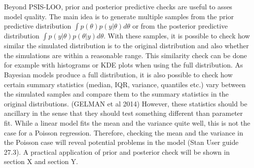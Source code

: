 Beyond PSIS-LOO, prior and posterior predictive checks are useful to asses model quality.
The main idea is to generate multiple samples from the prior predictive distribution $\int p(\theta) p(y|\theta)d\theta$ or from the posterior predictive distribution $\int p(y | \theta) p(\theta|y) d\theta$.
With these samples, it is possible to check how similar the simulated distribution is to the original distribution and also whether the simulations are within a reasonable range.
This similarity check can be done for example with histograms or KDE plots when using the full distribution.
As Bayesian models produce a full distribution, it is also possible to check how certain summary statistics (median, IQR, variance, quantiles etc.) vary between the simulated samples and compare them to the summary statistics in the original distributions. (GELMAN et al 2014)
However, these statistics should be ancillary in the sense that they should test something different than parameter fit.
While a linear model fits the mean and the variance quite well, this is not the case for a Poisson regression.
Therefore, checking the mean and the variance in the Poisson case will reveal potential problems in the model (Stan User guide 27.3).
A practical application of prior and posterior check will be shown in section X and section Y.




